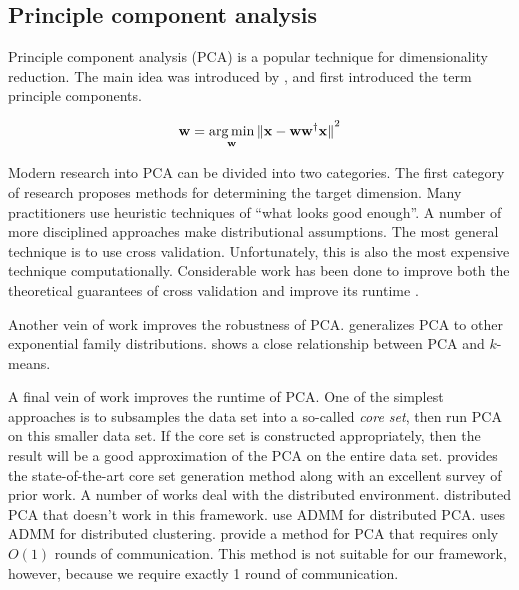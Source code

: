 \documentclass[thesis.tex]{subfiles}
\begin{document}

\subsection{Principle component analysis}

Principle component analysis (PCA) is a popular technique for dimensionality reduction.
The main idea was introduced by \cite{pearson1901liii}, 
and \cite{hotelling1933analysis} first introduced the term principle components.

\begin{equation}
    \mathbf w = \operatorname*{arg\,min}_\mathbf w {\lVert {\mathbf{x}- \mathbf w\ensuremath{{\mathbf w}^{\mathsf{\dagger}}}\mathbf{x}} \rVert}^2
\end{equation}

Modern research into PCA can be divided into two categories.
The first category of research proposes methods for determining the target dimension.
Many practitioners use heuristic techniques of ``what looks good enough''.
A number of more disciplined approaches make distributional assumptions.
The most general technique is to use cross validation.
Unfortunately, this is also the most expensive technique computationally.
Considerable work has been done to improve both the theoretical guarantees of cross validation and improve its runtime
\citep{wold1978cross,eastment1982cross,krzanowski1987cross,mertens1995efficient,diana2002cross,engelen2004fast,josse2012selecting,camacho2012cross}.

Another vein of work improves the robustness of PCA.
\cite{collins2002generalization} generalizes PCA to other exponential family distributions.
\cite{ding2004k} shows a close relationship between PCA and $k$-means.

A final vein of work improves the runtime of PCA.
One of the simplest approaches is to subsamples the data set into a so-called \emph{core set},
then run PCA on this smaller data set.
If the core set is constructed appropriately,
then the result will be a good approximation of the PCA on the entire data set.
\cite{garber2015fast} provides the state-of-the-art core set generation method
along with an excellent survey of prior work.
A number of works deal with the distributed environment.
\cite{bai2005principal} distributed PCA that doesn't work in this framework.
\cite{schizas2015distributed} use ADMM for distributed PCA.
\cite{liu2016decentralized} uses ADMM for distributed clustering.
\cite{kannan2014princople} provide a method for PCA that requires only $O(1)$ rounds of communication.
This method is not suitable for our framework, however, because we require exactly 1 round of communication.
\end{document}
